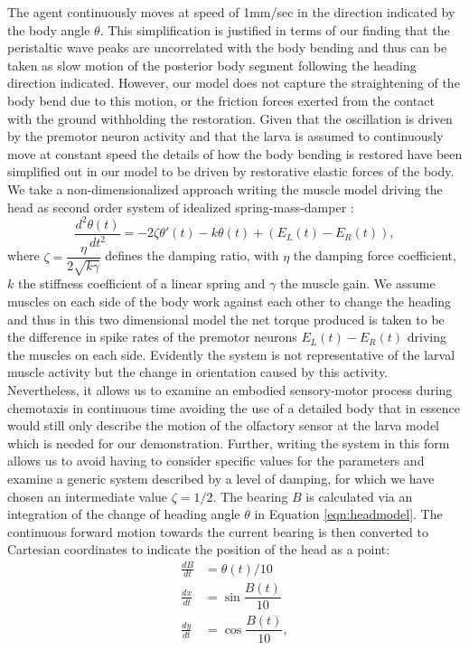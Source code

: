 \documentclass[11pt,a4paper]{article}
\begin{document}
The agent continuously moves at speed of 1mm/sec in the direction indicated by the body angle $\theta$. This simplification is justified in terms of our finding that the peristaltic wave peaks are uncorrelated with the body bending and thus can be taken as slow motion of the posterior body segment following the heading direction indicated. However, our model does not capture the straightening of the body bend due to this motion, or the friction forces exerted from the contact with the ground withholding the restoration. Given that the oscillation is driven by the premotor neuron activity and that the larva is assumed to continuously move at constant speed the details of how the body bending is restored have been simplified out in our model to be driven by restorative elastic forces of the body. 
 We take a non-dimensionalized approach writing the muscle model driving the head as second order system of idealized spring-mass-damper \cite[see][]{fung2013biomechanics}:
\begin{equation}
\label{eqn:headmodel}
\frac{d^2\theta(t)}{dt^2} = - 2 \zeta \theta'(t) - k \theta(t) + (E_L(t) - E_R(t)),
\end{equation}
where $\zeta= \dfrac{\eta}{ 2\sqrt{k \gamma}}$ defines the damping ratio, with $\eta$ the damping force coefficient, $k$ the stiffness coefficient of a linear spring and $\gamma$ the muscle gain.
We assume muscles on each side of the body work against each other to change the heading and thus in this two dimensional model the net torque produced is taken to be the difference in spike rates of the premotor neurons $E_L(t) - E_R(t)$ driving the muscles on each side. 
Evidently the system is not representative of the larval muscle activity but the change in orientation caused by this activity.
 Nevertheless, it allows us to examine an embodied sensory-motor process during chemotaxis in continuous time avoiding the use of a detailed body that in essence would still only describe the motion of the olfactory sensor at the larva model which is needed for our demonstration.
 Further, writing the system in this form allows us to avoid having to consider specific values for the parameters and examine a generic system described by a level of damping, for which we have chosen an intermediate value $\zeta=1/2$.
The bearing $B$ is calculated via an integration of the change of heading angle $\theta$ in Equation \ref{eqn:headmodel}. The continuous forward motion towards the current bearing is then converted to Cartesian coordinates to indicate the position of the head as a point:
\begin{align}
\frac{dB}{dt} &= \theta(t)/10 \\
\frac{dx}{dt} &= \sin{\dfrac{B(t)}{10}} \\
\frac{dy}{dt} &= \cos{\dfrac{B(t)}{10}},
\end{align}
\end{document}
